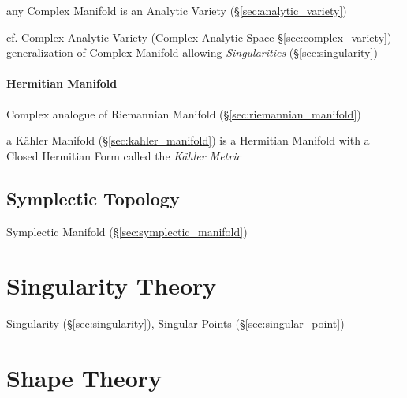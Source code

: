 any Complex Manifold is an Analytic Variety (\S\ref{sec:analytic_variety})

cf. Complex Analytic Variety (Complex Analytic Space
\S\ref{sec:complex_variety}) -- generalization of Complex Manifold allowing
\emph{Singularities} (\S\ref{sec:singularity})



\paragraph{Hermitian Manifold}\label{sec:hermitian_manifold}\hfill

Complex analogue of Riemannian Manifold (\S\ref{sec:riemannian_manifold})

a K\"ahler Manifold (\S\ref{sec:kahler_manifold}) is a Hermitian
Manifold with a Closed Hermitian Form called the \emph{K\"ahler
  Metric} %



\subsection{Symplectic Topology}\label{sec:symplectic_topology}

Symplectic Manifold (\S\ref{sec:symplectic_manifold})



\section{Singularity Theory}\label{sec:singularity_theory}

\fist Singularity (\S\ref{sec:singularity}), Singular Points
(\S\ref{sec:singular_point})



\section{Shape Theory}\label{sec:shape_theory}

